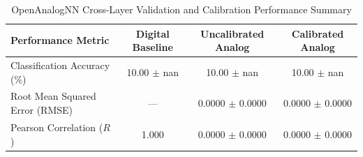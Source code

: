 \begin{table}[htbp]
\centering
\caption{OpenAnalogNN Cross-Layer Validation and Calibration Performance Summary}
\label{tab:analog_stats}
\begin{tabular}{lccc}
\hline
\textbf{Performance Metric} & \textbf{Digital Baseline} & \textbf{Uncalibrated Analog} & \textbf{Calibrated Analog} \\
\hline
Classification Accuracy (\%) & 10.00 $\pm$ nan & 10.00 $\pm$ nan & 10.00 $\pm$ nan \\
Root Mean Squared Error (RMSE) & --- & 0.0000 $\pm$ 0.0000 & 0.0000 $\pm$ 0.0000 \\
Pearson Correlation ($R$) & 1.000 & 0.0000 $\pm$ 0.0000 & 0.0000 $\pm$ 0.0000 \\
\hline
\end{tabular}
\end{table}